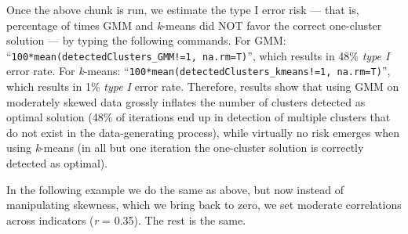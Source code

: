 \documentclass[
  man,floatsintext]{apa7}
\newenvironment{Shaded}{\begin{snugshade}}{\end{snugshade}}
\newcommand{\AttributeTok}[1]{\textcolor[rgb]{0.13,0.29,0.53}{#1}}
\newcommand{\CommentTok}[1]{\textcolor[rgb]{0.56,0.35,0.01}{\textit{#1}}}
\newcommand{\ConstantTok}[1]{\textcolor[rgb]{0.56,0.35,0.01}{#1}}
\newcommand{\ControlFlowTok}[1]{\textcolor[rgb]{0.13,0.29,0.53}{\textbf{#1}}}
\newcommand{\DecValTok}[1]{\textcolor[rgb]{0.00,0.00,0.81}{#1}}
\newcommand{\FloatTok}[1]{\textcolor[rgb]{0.00,0.00,0.81}{#1}}
\newcommand{\FunctionTok}[1]{\textcolor[rgb]{0.13,0.29,0.53}{\textbf{#1}}}
\newcommand{\NormalTok}[1]{#1}
\newcommand{\OtherTok}[1]{\textcolor[rgb]{0.56,0.35,0.01}{#1}}
\newcommand{\SpecialCharTok}[1]{\textcolor[rgb]{0.81,0.36,0.00}{\textbf{#1}}}
\begin{document}
\begin{Shaded}
\end{Shaded}

Once the above chunk is run, we estimate the type I error risk --- that is, percentage of times GMM and \emph{k}-means did NOT favor the correct one-cluster solution --- by typing the following commands. For GMM: ``\texttt{100*mean(detectedClusters\_GMM!=1,\ na.rm=T)}'', which results in 48\% \emph{type I} error rate. For \emph{k}-means: ``\texttt{100*mean(detectedClusters\_kmeans!=1,\ na.rm=T)}'', which results in 1\% \emph{type I} error rate. Therefore, results show that using GMM on moderately skewed data grossly inflates the number of clusters detected as optimal solution (48\% of iterations end up in detection of multiple clusters that do not exist in the data-generating process), while virtually no risk emerges when using \emph{k}-means (in all but one iteration the one-cluster solution is correctly detected as optimal).

In the following example we do the same as above, but now instead of manipulating skewness, which we bring back to zero, we set moderate correlations across indicators (\emph{r} = 0.35). The rest is the same.
\end{document}
